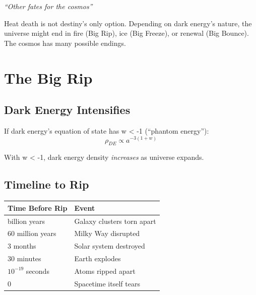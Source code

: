 \documentclass[
  11pt,
  letterpaper,
  twoside,
  openright]{book}
\begin{document}
\emph{``Other fates for the cosmos''}

\begin{tcolorbox}[enhanced jigsaw, coltitle=black, colbacktitle=quarto-callout-note-color!10!white, toprule=.15mm, colframe=quarto-callout-note-color-frame, arc=.35mm, opacityback=0, bottomtitle=1mm, toptitle=1mm, breakable, colback=white, titlerule=0mm, opacitybacktitle=0.6, title=\textcolor{quarto-callout-note-color}{\faInfo}\hspace{0.5em}{Key Revelation}, rightrule=.15mm, bottomrule=.15mm, leftrule=.75mm, left=2mm]

Heat death is not destiny's only option. Depending on dark energy's
nature, the universe might end in fire (Big Rip), ice (Big Freeze), or
renewal (Big Bounce). The cosmos has many possible endings.

\end{tcolorbox}

\section{The Big Rip}\label{the-big-rip}

\subsection{Dark Energy Intensifies}\label{dark-energy-intensifies}

If dark energy's equation of state has w \textless{} -1 (``phantom
energy''): \[
\rho_{DE} \propto a^{-3(1+w)}
\]

With w \textless{} -1, dark energy density \emph{increases} as universe
expands.

\subsection{Timeline to Rip}\label{timeline-to-rip}

\begin{longtable}[]{@{}ll@{}}
\toprule\noalign{}
Time Before Rip & Event \\
\midrule\noalign{}
\endhead
\bottomrule\noalign{}
\endlastfoot
1 billion years & Galaxy clusters torn apart \\
60 million years & Milky Way disrupted \\
3 months & Solar system destroyed \\
30 minutes & Earth explodes \\
\(10^{-19}\) seconds & Atoms ripped apart \\
0 & Spacetime itself tears \\
\end{longtable}
\end{document}
